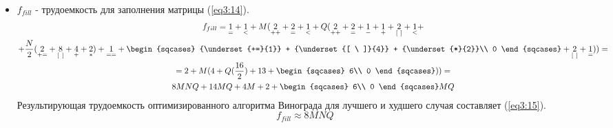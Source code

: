 \begin{itemize}
	\item $f_{fill}$ - трудоемкость для заполнения матрицы (\ref{eq3:14}).
	\begin{multline}
		f_{fill} = {\underset{=}{1}} + {\underset{<}{1}} + M({\underset{++}{2}} + {\underset{=}{2}} + {\underset{<}{1}} + Q({\underset{++}{2}} + {\underset{=}{2}} + {\underset{-}{1}} + {\underset{+}{1}} + {\underset{[\ ]}{2}} + {\underset{<}{1}} + \\
		+ \frac{N}{2}({\underset{+=}{2}} + {\underset{[\ ]}{8}} + {\underset{+}{4}} + {\underset{*}{2}}) + {\underset{==}{1}} 
		 +  \begin{sqcases}
				{\underset{+=}{1}} + {\underset{[ \ ]}{4}} + {\underset{*}{2}}\\
				0
			\end{sqcases} + {\underset{[\ ]}{2}} + {\underset{=}{1}})) = \\
		= 2 + M(4 + Q(\frac{16}{2}) + 13 + \begin{sqcases}
											6\\
											0
											\end{sqcases})) = \\
		8MNQ + 14MQ + 4M + 2 + \begin{sqcases}
									6\\
									0
									\end{sqcases} MQ
		\label{eq3:14}
	\end{multline}
	Результирующая трудоемкость оптимизированного алгоритма Винограда для лучшего и худшего случая составляет (\ref{eq3:15}).
	\begin{equation}
		f_{fill} \approx 8MNQ
		\label{eq3:15}
	\end{equation}
	
\end{itemize}

